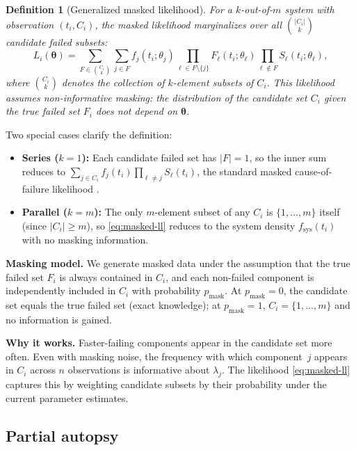 \documentclass[12pt]{article}
\newtheorem{definition}{Definition}
\newcommand{\fsys}{f_{\mathrm{sys}}}
\newcommand{\btheta}{\boldsymbol{\theta}}
\begin{document}
\begin{definition}[Generalized masked likelihood]\label{def:masked-ll}
For a $k$-out-of-$m$ system with observation $(t_i, C_i)$, the masked
likelihood marginalizes over all $\binom{|C_i|}{k}$ candidate failed
subsets:
\begin{equation}\label{eq:masked-ll}
  L_i(\btheta) = \sum_{F \in \binom{C_i}{k}}
    \sum_{j \in F} f_j(t_i; \theta_j)
    \prod_{\ell \in F \setminus \{j\}} F_\ell(t_i; \theta_\ell)
    \prod_{\ell \notin F} S_\ell(t_i; \theta_\ell),
\end{equation}
where $\binom{C_i}{k}$ denotes the collection of $k$-element subsets of
$C_i$.  This likelihood assumes non-informative masking: the distribution
of the candidate set $C_i$ given the true failed set $F_i$ does not
depend on $\btheta$.
\end{definition}

Two special cases clarify the definition:
\begin{itemize}
  \item \textbf{Series ($k = 1$):}  Each candidate failed set has
    $|F| = 1$, so the inner sum reduces to
    $\sum_{j \in C_i} f_j(t_i) \prod_{\ell \neq j} S_\ell(t_i)$, the
    standard masked cause-of-failure likelihood
    \citep{Miyakawa1984,LinUsherGuess1993}.
  \item \textbf{Parallel ($k = m$):}  The only $m$-element subset of any
    $C_i$ is $\{1, \ldots, m\}$ itself (since $|C_i| \geq m$), so
    \eqref{eq:masked-ll} reduces to the system density $\fsys(t_i)$ with
    no masking information.
\end{itemize}

\textbf{Masking model.}
We generate masked data under the assumption that the true failed set
$F_i$ is always contained in $C_i$, and each non-failed component is
independently included in $C_i$ with probability $p_{\text{mask}}$.
At $p_{\text{mask}} = 0$, the candidate set equals the true failed set
(exact knowledge); at $p_{\text{mask}} = 1$, $C_i = \{1, \ldots, m\}$
and no information is gained.

\textbf{Why it works.}
Faster-failing components appear in the candidate set more often.  Even
with masking noise, the frequency with which component~$j$ appears in
$C_i$ across $n$ observations is informative about $\lambda_j$.  The
likelihood \eqref{eq:masked-ll} captures this by weighting candidate
subsets by their probability under the current parameter estimates.

\subsection{Partial autopsy}\label{sec:autopsy}
\end{document}
